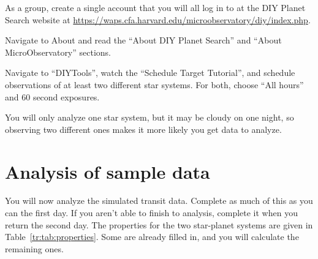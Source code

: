\begin{steps}

	\item As a group, create a single account that you will all log in to at the DIY Planet Search website at \url{https://waps.cfa.harvard.edu/microobservatory/diy/index.php}.
	
	\item Navigate to About and read the ``About DIY Planet Search'' and ``About MicroObservatory'' sections.
	
	
	\item Navigate to ``DIYTools'', watch the ``Schedule Target Tutorial'', and schedule observations of at least two different star systems. For both, choose ``All hours'' and 60 second exposures.
	
\end{steps}

You will only analyze one star system, but it may be cloudy on one night, so observing two different ones makes it more likely you get data to analyze.

\section{Analysis of sample data}

You will now analyze the simulated transit data. Complete as much of
this as you can the first day. If you aren’t able to finish to analysis,
complete it when you return the second day. The properties for the two star-planet systems are given in Table\ \ref{tr:tab:properties}. Some are already filled in, and you will calculate the remaining ones.

